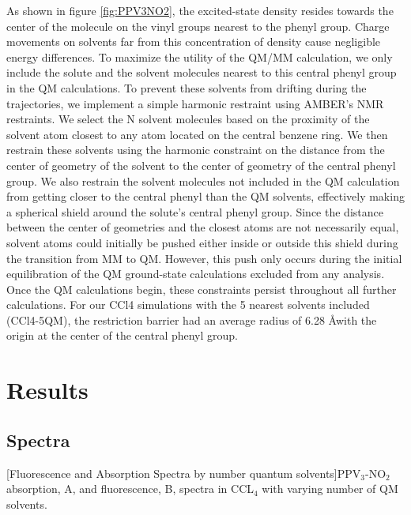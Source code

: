 As shown in figure \ref{fig:PPV3NO2}, the excited-state density resides towards the center of the molecule on the vinyl groups nearest to the phenyl group.
Charge movements on solvents far from this concentration of density cause negligible energy differences.
To maximize the utility of the QM/MM calculation, we only include the solute and the solvent molecules nearest to this central phenyl group in the QM calculations.
To prevent these solvents from drifting during the trajectories, we implement a simple harmonic restraint using AMBER's NMR restraints.
We select the N solvent molecules based on the proximity of the solvent atom closest to any atom located on the central benzene ring.
We then restrain these solvents using the harmonic constraint on the distance from the center of geometry of the solvent to the center of geometry of the central phenyl group.
We also restrain the solvent molecules not included in the QM calculation from getting closer to the central phenyl than the QM solvents, effectively making a spherical shield around the solute's central phenyl group.
Since the distance between the center of geometries and the closest atoms are not necessarily equal, solvent atoms could initially be pushed either inside or outside this shield during the transition from MM to QM.
However, this push only occurs during the initial equilibration of the QM ground-state calculations excluded from any analysis.
Once the QM calculations begin, these constraints persist throughout all further calculations.
For our CCl4 simulations with the 5 nearest solvents included (CCl4-5QM), the restriction barrier had an average radius of 6.28 \AA with the origin at the center of the central phenyl group.

\section{Results}

\subsection{Spectra}


\noindent
\begin{multiFigure} 
  [Fluorescence and Absorption Spectra by number quantum solvents]{PPV\(_3\)-NO\(_2\) absorption, A, and fluorescence, B, spectra in CCL\(_4\) with varying number of QM solvents.}
  \label{fig:spectrasolvents}
\end{multiFigure}\bigskip

